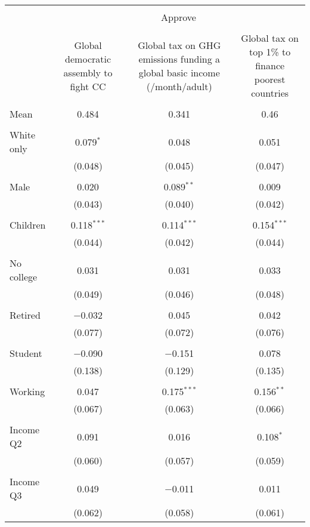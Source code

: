
\begin{tabular}{@{\extracolsep{5pt}}lccc} 
\\[-1.8ex]\hline 
\hline \\[-1.8ex] 
 & \multicolumn{3}{c}{Approve} \\ 
\cline{2-4} 
\\[-1.8ex] & Global democratic assembly to fight CC & Global tax on GHG emissions funding a global basic income (\textdollar 30/month/adult) & Global tax on top 1\% to finance poorest countries \\ 
\hline \\[-1.8ex] 
 Mean & 0.484 & 0.341 & 0.46  \\ \hline \\[-1.8ex] White only & 0.079$^{*}$ & 0.048 & 0.051 \\ 
  & (0.048) & (0.045) & (0.047) \\ 
  & & & \\ 
 Male & 0.020 & 0.089$^{**}$ & 0.009 \\ 
  & (0.043) & (0.040) & (0.042) \\ 
  & & & \\ 
 Children & 0.118$^{***}$ & 0.114$^{***}$ & 0.154$^{***}$ \\ 
  & (0.044) & (0.042) & (0.044) \\ 
  & & & \\ 
 No college & 0.031 & 0.031 & 0.033 \\ 
  & (0.049) & (0.046) & (0.048) \\ 
  & & & \\ 
 Retired & $-$0.032 & 0.045 & 0.042 \\ 
  & (0.077) & (0.072) & (0.076) \\ 
  & & & \\ 
 Student & $-$0.090 & $-$0.151 & 0.078 \\ 
  & (0.138) & (0.129) & (0.135) \\ 
  & & & \\ 
 Working & 0.047 & 0.175$^{***}$ & 0.156$^{**}$ \\ 
  & (0.067) & (0.063) & (0.066) \\ 
  & & & \\ 
 Income Q2 & 0.091 & 0.016 & 0.108$^{*}$ \\ 
  & (0.060) & (0.057) & (0.059) \\ 
  & & & \\ 
 Income Q3 & 0.049 & $-$0.011 & 0.011 \\ 
  & (0.062) & (0.058) & (0.061) \\ 

\end{tabular}

